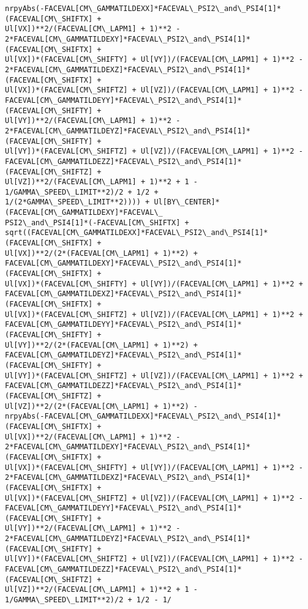 \documentclass[landscape,letterpaper,10pt,english]{article}
\begin{document}
\begin{Verbatim}[commandchars=\\\{\}]
nrpyAbs(-FACEVAL[CM\_GAMMATILDEXX]*FACEVAL\_PSI2\_and\_PSI4[1]*(FACEVAL[CM\_SHIFTX] +
Ul[VX])**2/(FACEVAL[CM\_LAPM1] + 1)**2 -
2*FACEVAL[CM\_GAMMATILDEXY]*FACEVAL\_PSI2\_and\_PSI4[1]*(FACEVAL[CM\_SHIFTX] +
Ul[VX])*(FACEVAL[CM\_SHIFTY] + Ul[VY])/(FACEVAL[CM\_LAPM1] + 1)**2 -
2*FACEVAL[CM\_GAMMATILDEXZ]*FACEVAL\_PSI2\_and\_PSI4[1]*(FACEVAL[CM\_SHIFTX] +
Ul[VX])*(FACEVAL[CM\_SHIFTZ] + Ul[VZ])/(FACEVAL[CM\_LAPM1] + 1)**2 -
FACEVAL[CM\_GAMMATILDEYY]*FACEVAL\_PSI2\_and\_PSI4[1]*(FACEVAL[CM\_SHIFTY] +
Ul[VY])**2/(FACEVAL[CM\_LAPM1] + 1)**2 -
2*FACEVAL[CM\_GAMMATILDEYZ]*FACEVAL\_PSI2\_and\_PSI4[1]*(FACEVAL[CM\_SHIFTY] +
Ul[VY])*(FACEVAL[CM\_SHIFTZ] + Ul[VZ])/(FACEVAL[CM\_LAPM1] + 1)**2 -
FACEVAL[CM\_GAMMATILDEZZ]*FACEVAL\_PSI2\_and\_PSI4[1]*(FACEVAL[CM\_SHIFTZ] +
Ul[VZ])**2/(FACEVAL[CM\_LAPM1] + 1)**2 + 1 - 1/GAMMA\_SPEED\_LIMIT**2)/2 + 1/2 +
1/(2*GAMMA\_SPEED\_LIMIT**2)))) + Ul[BY\_CENTER]*(FACEVAL[CM\_GAMMATILDEXY]*FACEVAL\_
PSI2\_and\_PSI4[1]*(-FACEVAL[CM\_SHIFTX] +
sqrt((FACEVAL[CM\_GAMMATILDEXX]*FACEVAL\_PSI2\_and\_PSI4[1]*(FACEVAL[CM\_SHIFTX] +
Ul[VX])**2/(2*(FACEVAL[CM\_LAPM1] + 1)**2) +
FACEVAL[CM\_GAMMATILDEXY]*FACEVAL\_PSI2\_and\_PSI4[1]*(FACEVAL[CM\_SHIFTX] +
Ul[VX])*(FACEVAL[CM\_SHIFTY] + Ul[VY])/(FACEVAL[CM\_LAPM1] + 1)**2 +
FACEVAL[CM\_GAMMATILDEXZ]*FACEVAL\_PSI2\_and\_PSI4[1]*(FACEVAL[CM\_SHIFTX] +
Ul[VX])*(FACEVAL[CM\_SHIFTZ] + Ul[VZ])/(FACEVAL[CM\_LAPM1] + 1)**2 +
FACEVAL[CM\_GAMMATILDEYY]*FACEVAL\_PSI2\_and\_PSI4[1]*(FACEVAL[CM\_SHIFTY] +
Ul[VY])**2/(2*(FACEVAL[CM\_LAPM1] + 1)**2) +
FACEVAL[CM\_GAMMATILDEYZ]*FACEVAL\_PSI2\_and\_PSI4[1]*(FACEVAL[CM\_SHIFTY] +
Ul[VY])*(FACEVAL[CM\_SHIFTZ] + Ul[VZ])/(FACEVAL[CM\_LAPM1] + 1)**2 +
FACEVAL[CM\_GAMMATILDEZZ]*FACEVAL\_PSI2\_and\_PSI4[1]*(FACEVAL[CM\_SHIFTZ] +
Ul[VZ])**2/(2*(FACEVAL[CM\_LAPM1] + 1)**2) -
nrpyAbs(-FACEVAL[CM\_GAMMATILDEXX]*FACEVAL\_PSI2\_and\_PSI4[1]*(FACEVAL[CM\_SHIFTX] +
Ul[VX])**2/(FACEVAL[CM\_LAPM1] + 1)**2 -
2*FACEVAL[CM\_GAMMATILDEXY]*FACEVAL\_PSI2\_and\_PSI4[1]*(FACEVAL[CM\_SHIFTX] +
Ul[VX])*(FACEVAL[CM\_SHIFTY] + Ul[VY])/(FACEVAL[CM\_LAPM1] + 1)**2 -
2*FACEVAL[CM\_GAMMATILDEXZ]*FACEVAL\_PSI2\_and\_PSI4[1]*(FACEVAL[CM\_SHIFTX] +
Ul[VX])*(FACEVAL[CM\_SHIFTZ] + Ul[VZ])/(FACEVAL[CM\_LAPM1] + 1)**2 -
FACEVAL[CM\_GAMMATILDEYY]*FACEVAL\_PSI2\_and\_PSI4[1]*(FACEVAL[CM\_SHIFTY] +
Ul[VY])**2/(FACEVAL[CM\_LAPM1] + 1)**2 -
2*FACEVAL[CM\_GAMMATILDEYZ]*FACEVAL\_PSI2\_and\_PSI4[1]*(FACEVAL[CM\_SHIFTY] +
Ul[VY])*(FACEVAL[CM\_SHIFTZ] + Ul[VZ])/(FACEVAL[CM\_LAPM1] + 1)**2 -
FACEVAL[CM\_GAMMATILDEZZ]*FACEVAL\_PSI2\_and\_PSI4[1]*(FACEVAL[CM\_SHIFTZ] +
Ul[VZ])**2/(FACEVAL[CM\_LAPM1] + 1)**2 + 1 - 1/GAMMA\_SPEED\_LIMIT**2)/2 + 1/2 - 1/

\end{Verbatim}
\end{document}
